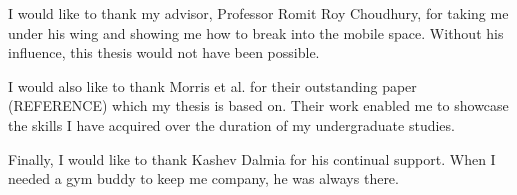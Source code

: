 I would like to thank my advisor, Professor Romit Roy Choudhury, for taking me under his wing and showing me how to break into the mobile space. Without his influence, this thesis would not have been possible.

I would also like to thank Morris et al. for their outstanding paper (REFERENCE) which my thesis is based on. Their work enabled me to showcase the skills I have acquired over the duration of my undergraduate studies.

Finally, I would like to thank Kashev Dalmia for his continual support. When I needed a gym buddy to keep me company, he was always there.